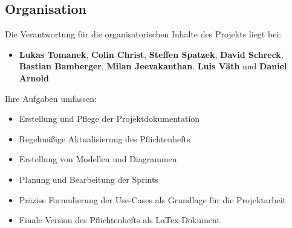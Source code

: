 \documentclass[%
	12pt,
	a4paper,
	oneside,
	parskip=full
]{scrbook}
\begin{document}
\subsection{Organisation}
Die Verantwortung für die organisatorischen Inhalte des Projekts liegt bei:
\begin{itemize}
	\item \textbf{Lukas Tomanek}, \textbf{Colin Christ}, \textbf{Steffen Spatzek}, \textbf{David Schreck}, \textbf{Bastian Bamberger}, \textbf{Milan Jeevakanthan}, \textbf{Luis Väth} und \textbf{Daniel Arnold}
\end{itemize}
Ihre Aufgaben umfassen:
\begin{itemize}
	\item Erstellung und Pflege der Projektdokumentation
	\item Regelmäßige Aktualisierung des Pflichtenhefts
	\item Erstellung von Modellen und Diagrammen
	\item Planung und Bearbeitung der Sprints
	\item Präzise Formulierung der Use-Cases als Grundlage für die Projektarbeit
	\item Finale Version des Pflichtenhefts als LaTex-Dokument
\end{itemize}
\end{document}
